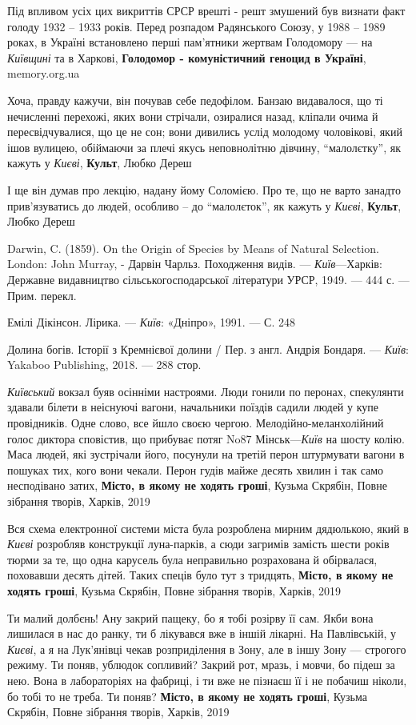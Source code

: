 Під впливом усіх цих викриттів СРСР врешті - решт змушений був визнати факт
голоду 1932 – 1933 років. Перед розпадом Радянського Союзу, у 1988 – 1989
роках, в Україні встановлено перші пам'ятники жертвам Голодомору — на
\emph{Київщині} та в Харкові, \textbf{Голодомор - комуністичний геноцид в Україні},
memory.org.ua

Хоча, правду кажучи, він почував себе педофілом. Банзаю видавалося, що ті
нечисленні перехожі, яких вони стрічали, озиралися назад, кліпали очима й
пересвідчувалися, що це не сон; вони дивились услід молодому чоловікові, який
ішов вулицею, обіймаючи за плечі якусь неповнолітню дівчину, \enquote{малолєтку}, як
кажуть у \emph{Києві}, \textbf{Культ}, Любко Дереш

І ще він думав про лекцію, надану йому Соломією. Про те, що не варто занадто
прив'язуватись до людей, особливо – до \enquote{малолєток}, як кажуть у \emph{Києві},
\textbf{Культ}, Любко Дереш

Darwin, C. (1859). On the Origin of Species by Means of Natural Selection.
London: John Murray, - Дарвін Чарльз. Походження видів. — \emph{Київ}—Харків:
Державне видавництво сільськогосподарської літератури УРСР, 1949. — 444 с. —
Прим. перекл.

Емілі Дікінсон. Лірика. — \emph{Київ}: «Дніпро», 1991. — С. 248

Долина богів. Історії з Кремнієвої долини / Пер. з англ. Андрія Бондаря. —
\emph{Київ}: Yakaboo Publishing, 2018. — 288 стор.

\emph{Київський} вокзал буяв осінніми настроями. Люди гонили по перонах,
спекулянти здавали білети в неіснуючі вагони, начальники поїздів садили людей у
купе провідників. Одне слово, все йшло своєю чергою. Мелодійно-меланхолійний
голос диктора сповістив, що прибуває потяг No87 Мінськ—\emph{Київ} на шосту
колію. Маса людей, які зустрічали його, посунули на третій перон штурмувати
вагони в пошуках тих, кого вони чекали. Перон гудів майже десять хвилин і так
само несподівано затих, \textbf{Місто, в якому не ходять гроші}, Кузьма
Скрябін, Повне зібрання творів, Харків, 2019

Вся схема електронної системи міста була розроблена мирним дядюлькою, який в
\emph{Києві} розробляв конструкції луна-парків, а сюди загримів замість шести років
тюрми за те, що одна карусель була неправильно розрахована й обірвалася,
поховавши десять дітей. Таких спеців було тут з тридцять, 
\textbf{Місто, в якому не ходять гроші},
Кузьма Скрябін, Повне зібрання творів, Харків, 2019

Ти малий долбєнь! Ану закрий пащеку, бо я тобі розірву її сам. Якби вона
лишилася в нас до ранку, ти б лікувався вже в іншій лікарні. На Павлівській, у
\emph{Києві}, а я на Лук'янівці чекав розприділення в Зону, але в іншу Зону — строгого
режиму. Ти поняв, ублюдок сопливий? Закрий рот, мразь, і мовчи, бо підеш за
нею. Вона в лабораторіях на фабриці, і ти вже не пізнаєш її і не побачиш
ніколи, бо тобі то не треба. Ти поняв?
\textbf{Місто, в якому не ходять гроші},
Кузьма Скрябін, Повне зібрання творів, Харків, 2019

